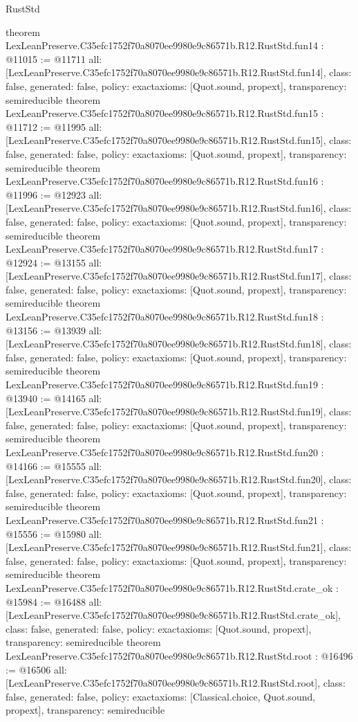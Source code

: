 \begin{lexlean}{RustStd}
\begin{coremodule}
{}
theorem LexLeanPreserve.C35efc1752f70a8070ee9980e9c86571b.R12.RustStd.fun14 : @11015 := @11711 {
  all: [LexLeanPreserve.C35efc1752f70a8070ee9980e9c86571b.R12.RustStd.fun14],
  class: false,
  generated: false,
  policy: exact{axioms: [Quot.sound, propext]},
  transparency: semireducible
}
theorem LexLeanPreserve.C35efc1752f70a8070ee9980e9c86571b.R12.RustStd.fun15 : @11712 := @11995 {
  all: [LexLeanPreserve.C35efc1752f70a8070ee9980e9c86571b.R12.RustStd.fun15],
  class: false,
  generated: false,
  policy: exact{axioms: [Quot.sound, propext]},
  transparency: semireducible
}
theorem LexLeanPreserve.C35efc1752f70a8070ee9980e9c86571b.R12.RustStd.fun16 : @11996 := @12923 {
  all: [LexLeanPreserve.C35efc1752f70a8070ee9980e9c86571b.R12.RustStd.fun16],
  class: false,
  generated: false,
  policy: exact{axioms: [Quot.sound, propext]},
  transparency: semireducible
}
theorem LexLeanPreserve.C35efc1752f70a8070ee9980e9c86571b.R12.RustStd.fun17 : @12924 := @13155 {
  all: [LexLeanPreserve.C35efc1752f70a8070ee9980e9c86571b.R12.RustStd.fun17],
  class: false,
  generated: false,
  policy: exact{axioms: [Quot.sound, propext]},
  transparency: semireducible
}
theorem LexLeanPreserve.C35efc1752f70a8070ee9980e9c86571b.R12.RustStd.fun18 : @13156 := @13939 {
  all: [LexLeanPreserve.C35efc1752f70a8070ee9980e9c86571b.R12.RustStd.fun18],
  class: false,
  generated: false,
  policy: exact{axioms: [Quot.sound, propext]},
  transparency: semireducible
}
theorem LexLeanPreserve.C35efc1752f70a8070ee9980e9c86571b.R12.RustStd.fun19 : @13940 := @14165 {
  all: [LexLeanPreserve.C35efc1752f70a8070ee9980e9c86571b.R12.RustStd.fun19],
  class: false,
  generated: false,
  policy: exact{axioms: [Quot.sound, propext]},
  transparency: semireducible
}
theorem LexLeanPreserve.C35efc1752f70a8070ee9980e9c86571b.R12.RustStd.fun20 : @14166 := @15555 {
  all: [LexLeanPreserve.C35efc1752f70a8070ee9980e9c86571b.R12.RustStd.fun20],
  class: false,
  generated: false,
  policy: exact{axioms: [Quot.sound, propext]},
  transparency: semireducible
}
theorem LexLeanPreserve.C35efc1752f70a8070ee9980e9c86571b.R12.RustStd.fun21 : @15556 := @15980 {
  all: [LexLeanPreserve.C35efc1752f70a8070ee9980e9c86571b.R12.RustStd.fun21],
  class: false,
  generated: false,
  policy: exact{axioms: [Quot.sound, propext]},
  transparency: semireducible
}
theorem LexLeanPreserve.C35efc1752f70a8070ee9980e9c86571b.R12.RustStd.crate_ok : @15984 := @16488 {
  all: [LexLeanPreserve.C35efc1752f70a8070ee9980e9c86571b.R12.RustStd.crate_ok],
  class: false,
  generated: false,
  policy: exact{axioms: [Quot.sound, propext]},
  transparency: semireducible
}
theorem LexLeanPreserve.C35efc1752f70a8070ee9980e9c86571b.R12.RustStd.root : @16496 := @16506 {
  all: [LexLeanPreserve.C35efc1752f70a8070ee9980e9c86571b.R12.RustStd.root],
  class: false,
  generated: false,
  policy: exact{axioms: [Classical.choice, Quot.sound, propext]},
  transparency: semireducible
}


\end{coremodule}
\end{lexlean}
